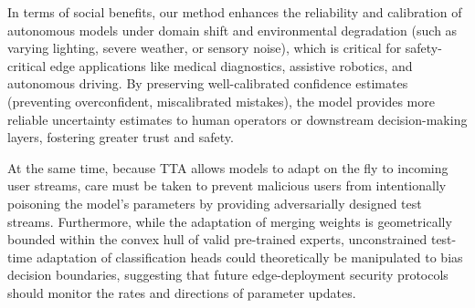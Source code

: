 \documentclass{article}
\begin{document}
In terms of social benefits, our method enhances the reliability and calibration of autonomous models under domain shift and environmental degradation (such as varying lighting, severe weather, or sensory noise), which is critical for safety-critical edge applications like medical diagnostics, assistive robotics, and autonomous driving. By preserving well-calibrated confidence estimates (preventing overconfident, miscalibrated mistakes), the model provides more reliable uncertainty estimates to human operators or downstream decision-making layers, fostering greater trust and safety.

At the same time, because TTA allows models to adapt on the fly to incoming user streams, care must be taken to prevent malicious users from intentionally poisoning the model's parameters by providing adversarially designed test streams. Furthermore, while the adaptation of merging weights is geometrically bounded within the convex hull of valid pre-trained experts, unconstrained test-time adaptation of classification heads could theoretically be manipulated to bias decision boundaries, suggesting that future edge-deployment security protocols should monitor the rates and directions of parameter updates.
\end{document}
